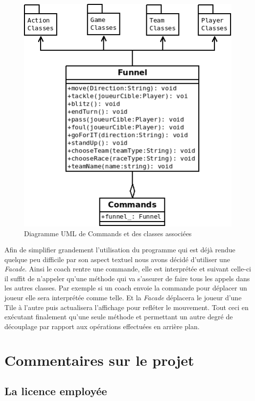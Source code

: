 \documentclass{article}
\newcommand{\pattern}{\emph}
\begin{document}
            \begin{figure}[H]
                \centerline{\includegraphics[scale=0.5]{img/Commands.png}}
                \caption{\label{DiaCommands} Diagramme UML de Commands et des classes associées}
            \end{figure}
            
            Afin de simplifier grandement l'utilisation du programme qui est déjà rendue quelque peu difficile par son aspect textuel nous avons décidé d'utiliser une \pattern{Facade}. Ainsi le coach rentre une commande, elle est interprétée et suivant celle-ci il suffit de n'appeler qu'une méthode qui va s'assurer de faire tous les appels dans les autres classes. Par exemple si un coach envoie la commande pour déplacer un joueur elle sera interprétée comme telle. Et la \pattern{Facade} déplacera le joueur d'une Tile à l'autre puis actualisera l'affichage pour refléter le mouvement. Tout ceci en exécutant finalement qu'une seule méthode et permettant un autre degré de découplage par rapport aux opérations effectuées en arrière plan.
 
 \section{Commentaires sur le projet}

    \subsection{La licence employée}
    
\end{document}
